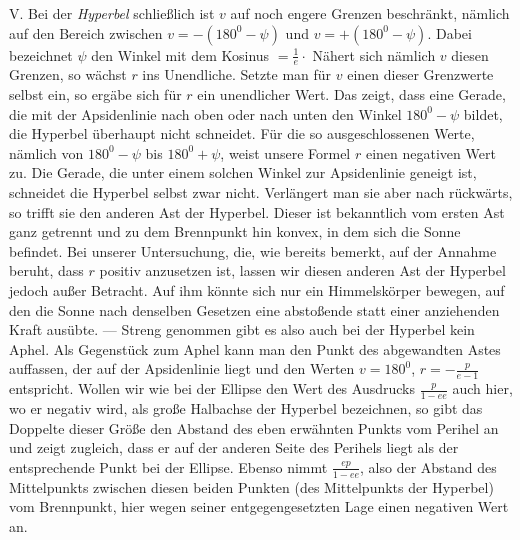 V. Bei der \emph{Hyperbel} schließlich ist $v$ auf noch engere Grenzen beschränkt, nämlich auf den Bereich zwischen $v = -(180^0-\psi)$ und $v = +(180^0-\psi)$. Dabei bezeichnet $\psi$ den Winkel mit dem Kosinus $= \frac{1}{e}\cdot$ Nähert sich nämlich $v$ diesen Grenzen, so wächst $r$ ins Unendliche. Setzte man für $v$ einen dieser Grenzwerte selbst ein, so ergäbe sich für $r$ ein unendlicher Wert. Das zeigt, dass eine Gerade, die mit der Apsidenlinie nach oben oder nach unten den Winkel $180^0-\psi$ bildet, die Hyperbel überhaupt nicht schneidet. Für die so ausgeschlossenen Werte, nämlich von $180^0-\psi$ bis $180^0+\psi$, weist unsere Formel $r$ einen negativen Wert zu. Die Gerade, die unter einem solchen Winkel zur Apsidenlinie geneigt ist, schneidet die Hyperbel selbst zwar nicht. Verlängert man sie aber nach rückwärts, so trifft sie den anderen Ast der Hyperbel. Dieser ist bekanntlich vom ersten Ast ganz getrennt und zu dem Brennpunkt hin konvex, in dem sich die Sonne befindet. Bei unserer Untersuchung, die, wie bereits bemerkt, auf der Annahme beruht, dass $r$ positiv anzusetzen ist, lassen wir diesen anderen Ast der Hyperbel jedoch außer Betracht. Auf ihm könnte sich nur ein Himmelskörper bewegen, auf den die Sonne nach denselben Gesetzen eine abstoßende statt einer anziehenden Kraft ausübte. — Streng genommen gibt es also auch bei der Hyperbel kein Aphel. Als Gegenstück zum Aphel kann man den Punkt des abgewandten Astes auffassen, der auf der Apsidenlinie liegt und den Werten $v = 180^0$, $r = -\frac{p}{e-1}$ entspricht. Wollen wir wie bei der Ellipse den Wert des Ausdrucks $\frac{p}{1-ee}$ auch hier, wo er negativ wird, als große Halbachse der Hyperbel bezeichnen, so gibt das Doppelte dieser Größe den Abstand des eben erwähnten Punkts vom Perihel an und zeigt zugleich, dass er auf der anderen Seite des Perihels liegt als der entsprechende Punkt bei der Ellipse. Ebenso nimmt $\frac{ep}{1-ee}$, also der Abstand des Mittelpunkts zwischen diesen beiden Punkten (des Mittelpunkts der Hyperbel) vom Brennpunkt, hier wegen seiner entgegengesetzten Lage einen negativen Wert an.
